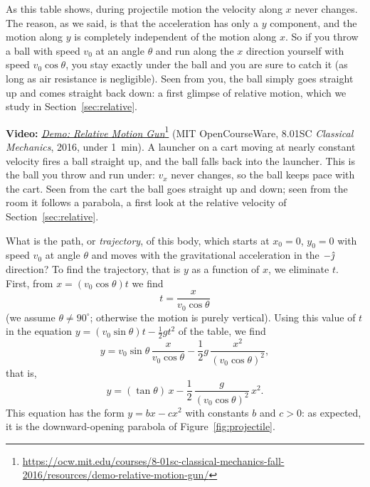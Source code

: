 \documentclass[11pt,a4paper]{article}
\begin{document}
As this table shows, during projectile motion the velocity along $x$ never changes. The reason, as
we said, is that the acceleration has only a $y$ component, and the motion along $y$ is completely
independent of the motion along $x$. So if you throw a ball with speed $v_0$ at an angle $\theta$
and run along the $x$ direction yourself with speed $v_0\cos\theta$, you stay exactly under the
ball and you are sure to catch it (as long as air resistance is negligible). Seen from you, the
ball simply goes straight up and comes straight back down: a first glimpse of relative motion,
which we study in Section~\ref{sec:relative}.

\begin{aside}
\textbf{Video:}
\href{https://ocw.mit.edu/courses/8-01sc-classical-mechanics-fall-2016/resources/demo-relative-motion-gun/}{\emph{Demo:
Relative Motion Gun}}\footnote{\url{https://ocw.mit.edu/courses/8-01sc-classical-mechanics-fall-2016/resources/demo-relative-motion-gun/}}
(MIT OpenCourseWare, 8.01SC \emph{Classical Mechanics}, 2016, under 1~min). A launcher on a cart
moving at nearly constant velocity fires a ball straight up, and the ball falls back into the
launcher. This is the ball you throw and run under: $v_x$ never changes, so the ball keeps pace
with the cart. Seen from the cart the ball goes straight up and down; seen from the room it follows
a parabola, a first look at the relative velocity of Section~\ref{sec:relative}.
\end{aside}

What is the path, or \emph{trajectory}, of this body, which starts at $x_0 = 0$, $y_0 = 0$ with
speed $v_0$ at angle $\theta$ and moves with the gravitational acceleration in the $-\hat{\jmath}$
direction? To find the trajectory, that is $y$ as a function of $x$, we eliminate $t$. First, from
$x = (v_0\cos\theta)t$ we find
\begin{equation}\label{eq:t-of-x}
  t = \frac{x}{v_0\cos\theta}
\end{equation}
(we assume $\theta \neq 90^\circ$; otherwise the motion is purely vertical). Using this value of
$t$ in the equation $y = (v_0\sin\theta)t - \frac12 gt^2$ of the table, we find
\[
  y = v_0\sin\theta\,\frac{x}{v_0\cos\theta} - \frac12 g\,\frac{x^2}{(v_0\cos\theta)^2} ,
\]
that is,
\begin{equation}\label{eq:trajectory}
  y = (\tan\theta)\,x - \frac12\,\frac{g}{(v_0\cos\theta)^2}\,x^2 .
\end{equation}
This equation has the form $y = bx - cx^2$ with constants $b$ and $c > 0$: as expected, it is the
downward-opening parabola of Figure~\ref{fig:projectile}.
\end{document}
